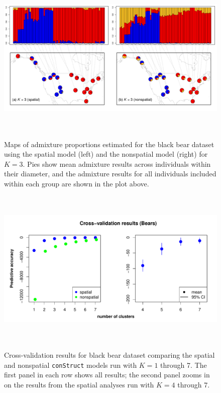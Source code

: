 \documentclass[12pt]{article}
\begin{document}
\begin{figure}
	\centering
		{\includegraphics[width=6in,height=3in]{figs/bears/Fig6_sp_vs_nsp.pdf}}
	\caption{
	Maps of admixture proportions estimated for the black bear dataset 
	using the spatial model (left) and the nonspatial model (right) for $K=3$.
	Pies show mean admixture results across individuals within their diameter, 
	and the admixture results for all individuals included within each group are 
	shown in the plot above.
    }\label{bear_K3}
\end{figure}

\begin{figure}
	\centering
		{\includegraphics[width=6in,height=3in]{figs/bears/bear_std_xval.pdf}}
	\caption{
	Cross-validation results for black bear dataset 
	comparing the spatial and nonspatial \texttt{conStruct} models run with $K=1$ through 7.  
	The first panel in each row shows all results; 
	the second panel zooms in on the results from the spatial analyses run with $K = 4$ through 7.
    }\label{bear_xvals}
\end{figure}
\end{document}
